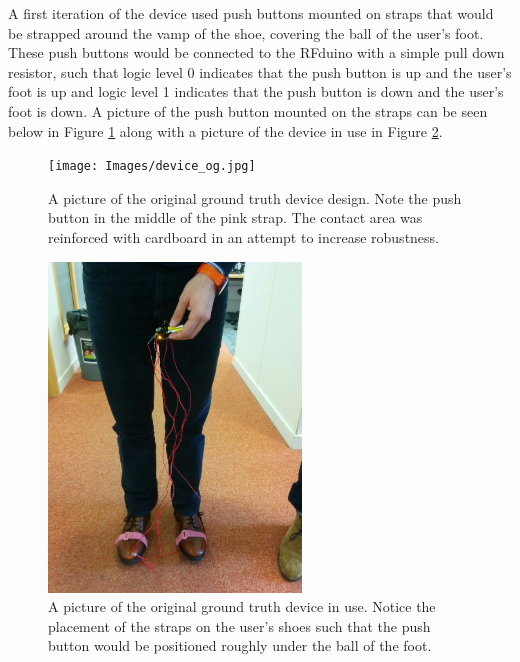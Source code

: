             A first iteration of the device used push buttons mounted on straps that would be strapped around the vamp of the shoe, covering the ball of the user's foot. These push buttons would be connected to the RFduino with a simple pull down resistor, such that logic level 0 indicates that the push button is up and the user's foot is up and logic level 1 indicates that the push button is down and the user's foot is down. A picture of the push button mounted on the straps can be seen below in Figure \ref{img_device_og} along with a picture of the device in use in Figure \ref{img_device_og_use}.

            \begin{figure}[!th]
                \texttt{[image: Images/device\_og.jpg]}
                \centering
                \caption{A picture of the original ground truth device design. Note the push button in the middle of the pink strap. The contact area was reinforced with cardboard in an attempt to increase robustness.}
                \label{img_device_og}
            \end{figure}

            \begin{figure}[!th]
                \includegraphics[width=0.6\textwidth]{Images/device_og_use.jpg}
                \centering
                \caption{A picture of the original ground truth device in use. Notice the placement of the straps on the user's shoes such that the push button would be positioned roughly under the ball of the foot.}
                \label{img_device_og_use}
            \end{figure}


